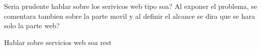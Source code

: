 Seria prudente hablar sobre los serivicos web tipo soa?
Al exponer el problema, se comentara tambien sobre la parte movil y al definir el alcance se dira que se hara solo la parte web?


Hablar sobre servicios web
soa
rest
